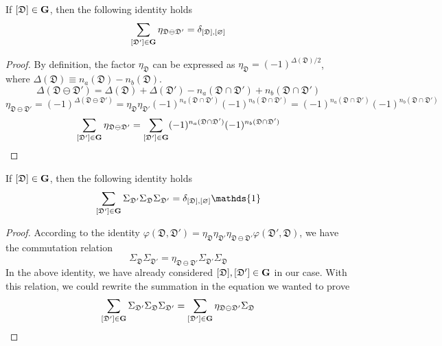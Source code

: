 \begin{lemma}
    If $[\mathfrak{D}]\in\mathbf{G}$, then the following identity holds
    \[
    \sum_{[\mathfrak{D}']\in\mathbf{G}}\eta_{\mathfrak{D}\ominus\mathfrak{D}'} 
    = 
    \delta_{[\mathfrak{D}],[\varnothing]}
    \]
\end{lemma}
\begin{proof}
    By definition, the factor $\eta_{\mathfrak{D}}$ can be expressed as $\eta_{\mathfrak{D}} = (-1)^{\Delta(\mathfrak{D})/2}$, where $\Delta(\mathfrak{D}) \equiv n_a(\mathfrak{D})-n_b(\mathfrak{D})$. 
    \[
    \Delta(\mathfrak{D}\ominus\mathfrak{D}') 
    = 
    \Delta(\mathfrak{D})
    +
    \Delta(\mathfrak{D}')
    - n_a(\mathfrak{D}\cap\mathfrak{D}') 
    + n_b(\mathfrak{D}\cap\mathfrak{D}') 
    \]
    \[
    \eta_{\mathfrak{D}\ominus\mathfrak{D}'}
    =
    (-1)^{\Delta(\mathfrak{D}\ominus\mathfrak{D}')}
    =
    \eta_{\mathfrak{D}}\eta_{\mathfrak{D}'}
    (-1)^{n_a(\mathfrak{D}\cap\mathfrak{D}') }(-1)^{n_b(\mathfrak{D}\cap\mathfrak{D}')}
    =
    (-1)^{n_a(\mathfrak{D}\cap\mathfrak{D}') }(-1)^{n_b(\mathfrak{D}\cap\mathfrak{D}')}
    \]
    \[
    \sum_{[\mathfrak{D}']\in\mathbf{G}} \eta_{\mathfrak{D}\ominus\mathfrak{D}'}
    =
    \sum_{[\mathfrak{D}']\in\mathbf{G}}(-1)^{n_a(\mathfrak{D}\cap\mathfrak{D}') }(-1)^{n_b(\mathfrak{D}\cap\mathfrak{D}')}
    \]
\end{proof}
\begin{lemma}
    If $[\mathfrak{D}]\in\mathbf{G}$, then the following identity holds
    \[
    \sum_{[\mathfrak{D}']\in\bo{G}} \Sigma_{\mathfrak{D}'}\Sigma_{\mathfrak{D}}\Sigma_{\mathfrak{D}'} 
    = 
    \delta_{[\mathfrak{D}],[\varnothing]}
    \mathds{1}
    \]
\end{lemma}
\begin{proof}
    According to the identity $\varphi(\mathfrak{D},\mathfrak{D}') = \eta_{\mathfrak{D}}\eta_{\mathfrak{D}'}\eta_{\mathfrak{D}\ominus\mathfrak{D}'}\varphi(\mathfrak{D}',\mathfrak{D})$, we have the commutation relation 
    \[
    \Sigma_{\mathfrak{D}}\Sigma_{\mathfrak{D}'} = \eta_{\mathfrak{D}\ominus\mathfrak{D}'} \Sigma_{\mathfrak{D}'}\Sigma_{\mathfrak{D}}
    \]
    In the above identity, we have already considered $[\mathfrak{D}],[\mathfrak{D}']\in\mathbf{G}$ in our case. With this relation, we could rewrite the summation in the equation we wanted to prove
    \[
    \sum_{[\mathfrak{D}']\in\mathbf{G}} \Sigma_{\mathfrak{D}'}\Sigma_{\mathfrak{D}}\Sigma_{\mathfrak{D}'}
    =
    \sum_{[\mathfrak{D}']\in\mathbf{G}} 
    \eta_{\mathfrak{D}\ominus\mathfrak{D}'}
    \Sigma_{\mathfrak{D}}
    \]
\end{proof}

